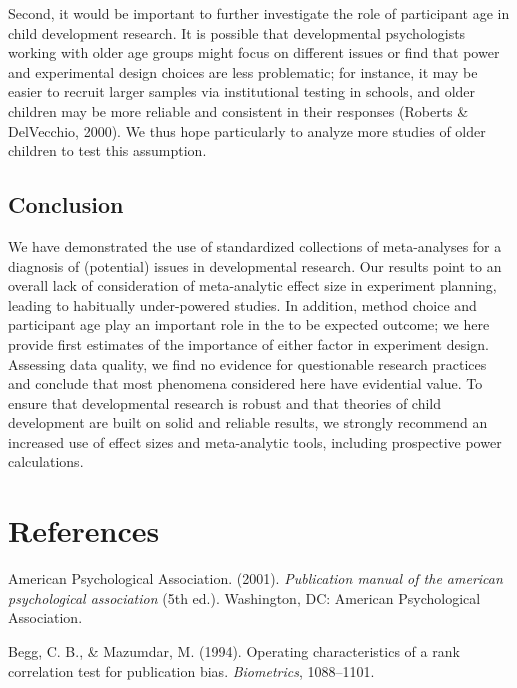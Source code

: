 \documentclass[english,floatsintext,man]{apa6}
\begin{document}
Second, it would be important to further investigate the role of
participant age in child development research. It is possible that
developmental psychologists working with older age groups might focus on
different issues or find that power and experimental design choices are
less problematic; for instance, it may be easier to recruit larger
samples via institutional testing in schools, and older children may be
more reliable and consistent in their responses (Roberts \& DelVecchio,
2000). We thus hope particularly to analyze more studies of older
children to test this assumption.

\subsection{Conclusion}\label{conclusion}

We have demonstrated the use of standardized collections of
meta-analyses for a diagnosis of (potential) issues in developmental
research. Our results point to an overall lack of consideration of
meta-analytic effect size in experiment planning, leading to habitually
under-powered studies. In addition, method choice and participant age
play an important role in the to be expected outcome; we here provide
first estimates of the importance of either factor in experiment design.
Assessing data quality, we find no evidence for questionable research
practices and conclude that most phenomena considered here have
evidential value. To ensure that developmental research is robust and
that theories of child development are built on solid and reliable
results, we strongly recommend an increased use of effect sizes and
meta-analytic tools, including prospective power calculations.

\newpage

\section{References}\label{references}

\setlength{\parindent}{-0.5in} \setlength{\leftskip}{0.5in}

\hypertarget{refs}{}
\hypertarget{ref-APA2001}{}
American Psychological Association. (2001). \emph{Publication manual of
the american psychological association} (5th ed.). Washington, DC:
American Psychological Association.

\hypertarget{ref-pubbias}{}
Begg, C. B., \& Mazumdar, M. (1994). Operating characteristics of a rank
correlation test for publication bias. \emph{Biometrics}, 1088--1101.
\end{document}
